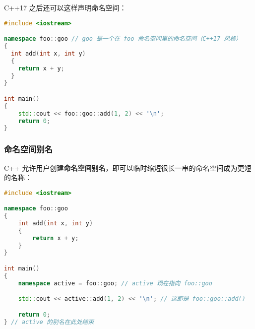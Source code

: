 \documentclass[../../LearnCpp.tex]{subfiles}
\begin{document}
C++17 之后还可以这样声明命名空间：

\begin{lstlisting}[language=C++]
#include <iostream>

namespace foo::goo // goo 是一个在 foo 命名空间里的命名空间（C++17 风格）
{
  int add(int x, int y)
  {
    return x + y;
  }
}

int main()
{
    std::cout << foo::goo::add(1, 2) << '\n';
    return 0;
}
\end{lstlisting}

\subsubsection*{命名空间别名}

C++ 允许用户创建\textbf{命名空间别名}，即可以临时缩短很长一串的命名空间成为更短的名称：

\begin{lstlisting}[language=C++]
#include <iostream>

namespace foo::goo
{
    int add(int x, int y)
    {
        return x + y;
    }
}

int main()
{
    namespace active = foo::goo; // active 现在指向 foo::goo

    std::cout << active::add(1, 2) << '\n'; // 这即是 foo::goo::add()

    return 0;
} // active 的别名在此处结束
\end{lstlisting}
\end{document}
